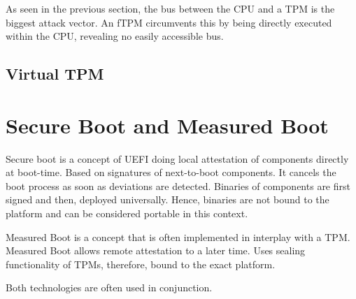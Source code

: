 As seen in the previous section, the bus between the CPU and a TPM is the biggest attack vector. An fTPM circumvents this by being directly executed within the CPU, revealing no easily accessible bus.

\subsection{Virtual TPM}



\section{Secure Boot and Measured Boot}

Secure boot is a concept of UEFI doing local attestation of components directly at boot-time. Based on signatures of next-to-boot components. It cancels the boot process as soon as deviations are detected. Binaries of components are first signed and then, deployed universally. Hence, binaries are not bound to the platform and can be considered portable in this context.

Measured Boot is a concept that is often implemented in interplay with a TPM. Measured Boot allows remote attestation to a later time. Uses sealing functionality of TPMs, therefore, bound to the exact platform.

Both technologies are often used in conjunction.
